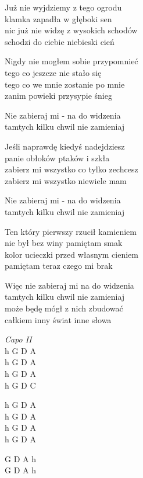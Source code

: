 \begin{text}
    \hfill\break
    Już nie wyjdziemy z tego ogrodu\\
    klamka zapadła w głęboki sen\\
    nic już nie widzę z wysokich schodów\\
    schodzi do ciebie niebieski cień

    Nigdy nie mogłem sobie przypomnieć\\
    tego co jeszcze nie stało się\\
    tego co we mnie zostanie po mnie\\
    zanim powieki przysypie śnieg

    Nie zabieraj mi - na do widzenia\\
    tamtych kilku chwil nie zamieniaj

    Jeśli naprawdę kiedyś nadejdziesz\\
    panie obłoków ptaków i szkła\\
    zabierz mi wszystko co tylko zechcesz\\
    zabierz mi wszystko niewiele mam

    Nie zabieraj mi - na do widzenia\\
    tamtych kilku chwil nie zamieniaj

    Ten który pierwszy rzucił kamieniem\\
    nie był bez winy pamiętam smak\\
    kolor ucieczki przed własnym cieniem\\
    pamiętam teraz czego mi brak

    Więc nie zabieraj mi na do widzenia\\
    tamtych kilku chwil nie zamieniaj\\
    może będę mógł z nich zbudować\\
    całkiem inny świat inne słowa
\end{text}
\begin{chord}
    \textit{Capo II}\\
    h G D A\\
    h G D A\\
    h G D A\\
    h G D C

    h G D A\\
    h G D A\\
    h G D A\\
    h G D A

    G D A h\\
    G D A h
\end{chord}